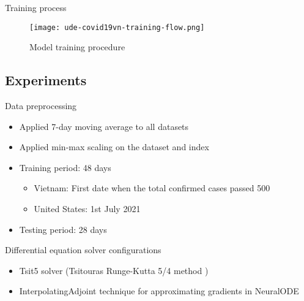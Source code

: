 \begin{frame}{Training process}
    \begin{figure}[h]
        \centering
        \texttt{[image: ude-covid19vn-training-flow.png]}
        \caption[Training procedure]{Model training procedure}
        \label{fig:model-training-flow}
    \end{figure}
\end{frame}

\subsection{Experiments}

\begin{frame}{Data preprocessing}
    \begin{itemize}
        \item<1-> Applied 7-day moving average to all datasets
        \item<1-> Applied min-max scaling on the  dataset and  index
        \item<2-> Training period: 48 days
        \begin{itemize}
            \item Vietnam: First date when the total confirmed cases passed 500
            \item United States: 1st July 2021
        \end{itemize}
        \item<3-> Testing period: 28 days
    \end{itemize}
\end{frame}

\begin{frame}{Differential equation solver configurations}
    \begin{itemize}
        \item Tsit5 solver (Tsitouras Runge-Kutta 5/4 method \cite{tsitourasRungeKuttaPairs2011})
        \item InterpolatingAdjoint technique for approximating gradients in \gls{NeuralODE} \cite{daulbaevInterpolationTechniqueSpeed2020}
    \end{itemize}
\end{frame}

